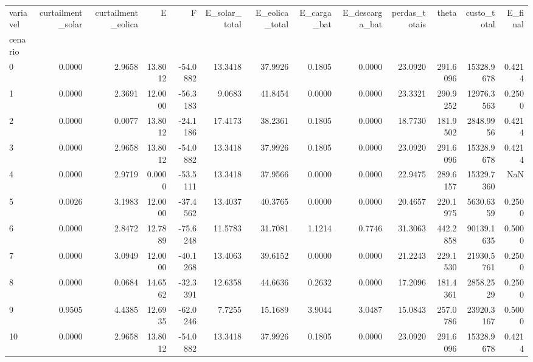 \begin{tabular}{lrrrrrrrrrrrr}
\toprule
variavel & curtailment_solar & curtailment_eolica & E & F & E_solar_total & E_eolica_total & E_carga_bat & E_descarga_bat & perdas_totais & theta & custo_total & E_final \\
cenario &  &  &  &  &  &  &  &  &  &  &  &  \\
\midrule
0 & 0.0000 & 2.9658 & 13.8012 & -54.0882 & 13.3418 & 37.9926 & 0.1805 & 0.0000 & 23.0920 & 291.6096 & 15328.9678 & 0.4214 \\
1 & 0.0000 & 2.3691 & 12.0000 & -56.3183 & 9.0683 & 41.8454 & 0.0000 & 0.0000 & 23.3321 & 290.9252 & 12976.3563 & 0.2500 \\
2 & 0.0000 & 0.0077 & 13.8012 & -24.1186 & 17.4173 & 38.2361 & 0.1805 & 0.0000 & 18.7730 & 181.9502 & 2848.9956 & 0.4214 \\
3 & 0.0000 & 2.9658 & 13.8012 & -54.0882 & 13.3418 & 37.9926 & 0.1805 & 0.0000 & 23.0920 & 291.6096 & 15328.9678 & 0.4214 \\
4 & 0.0000 & 2.9719 & 0.0000 & -53.5111 & 13.3418 & 37.9566 & 0.0000 & 0.0000 & 22.9475 & 289.6157 & 15329.7360 & NaN \\
5 & 0.0026 & 3.1983 & 12.0000 & -37.4562 & 13.4037 & 40.3765 & 0.0000 & 0.0000 & 20.4657 & 220.1975 & 5630.6359 & 0.2500 \\
6 & 0.0000 & 2.8472 & 12.7889 & -75.6248 & 11.5783 & 31.7081 & 1.1214 & 0.7746 & 31.3063 & 442.2858 & 90139.1635 & 0.5000 \\
7 & 0.0000 & 3.0949 & 12.0000 & -40.1268 & 13.4063 & 39.6152 & 0.0000 & 0.0000 & 21.2243 & 229.1530 & 21930.5761 & 0.2500 \\
8 & 0.0000 & 0.0684 & 14.6562 & -32.3391 & 12.6358 & 44.6636 & 0.2632 & 0.0000 & 17.2096 & 181.4361 & 2858.2529 & 0.2500 \\
9 & 0.9505 & 4.4385 & 12.6935 & -62.0246 & 7.7255 & 15.1689 & 3.9044 & 3.0487 & 15.0843 & 257.0786 & 23920.3167 & 0.5000 \\
10 & 0.0000 & 2.9658 & 13.8012 & -54.0882 & 13.3418 & 37.9926 & 0.1805 & 0.0000 & 23.0920 & 291.6096 & 15328.9678 & 0.4214 \\
\bottomrule
\end{tabular}

